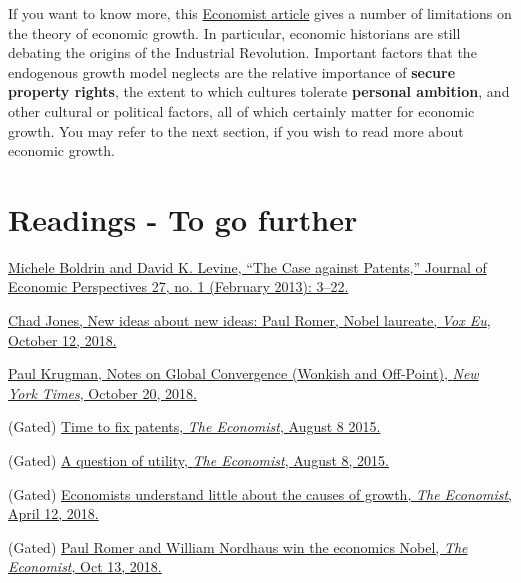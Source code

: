 \documentclass[]{book}
\theoremstyle{definition}
\theoremstyle{definition}
\theoremstyle{definition}
\theoremstyle{remark}
\begin{document}
If you want to know more, this
\href{https://www.economist.com/finance-and-economics/2018/04/12/economists-understand-little-about-the-causes-of-growth}{Economist
article} gives a number of limitations on the theory of economic growth.
In particular, economic historians are still debating the origins of the
Industrial Revolution. Important factors that the endogenous growth
model neglects are the relative importance of \textbf{secure property
rights}, the extent to which cultures tolerate \textbf{personal
ambition}, and other cultural or political factors, all of which
certainly matter for economic growth. You may refer to the next section,
if you wish to read more about economic growth.

\section*{Readings - To go further}\label{readings---to-go-further-2}

\href{https://doi.org/10.1257/jep.27.1.3}{Michele Boldrin and David K.
Levine, ``The Case against Patents,'' Journal of Economic Perspectives
27, no. 1 (February 2013): 3--22.}

\href{https://voxeu.org/article/new-ideas-about-new-ideas-paul-romer-nobel-laureate}{Chad
Jones, New ideas about new ideas: Paul Romer, Nobel laureate, \emph{Vox
Eu}, October 12, 2018.}

\href{https://search.proquest.com/docview/2123033147/1417E92D94B43EFPQ/3?accountid=14512}{Paul
Krugman, Notes on Global Convergence (Wonkish and Off-Point), \emph{New
York Times}, October 20, 2018.}

(Gated)
\href{https://www.economist.com/news/leaders/21660522-ideas-fuel-economy-todays-patent-systems-are-rotten-way-rewarding-them-time-fix}{Time
to fix patents, \emph{The Economist}, August 8 2015.}

(Gated)
\href{https://www.economist.com/international/2015/08/08/a-question-of-utility}{A
question of utility, \emph{The Economist}, August 8, 2015.}

(Gated)
\href{https://www.economist.com/finance-and-economics/2018/04/12/economists-understand-little-about-the-causes-of-growth}{Economists
understand little about the causes of growth, \emph{The Economist},
April 12, 2018.}

(Gated)
\href{https://www.economist.com/finance-and-economics/2018/10/13/paul-romer-and-william-nordhaus-win-the-economics-nobel?fsrc=scn/fb/te/bl/ed/paulromerandwilliamnordhauswintheeconomicsnobelfreeexchange}{Paul
Romer and William Nordhaus win the economics Nobel, \emph{The
Economist}, Oct 13, 2018.}
\end{document}
